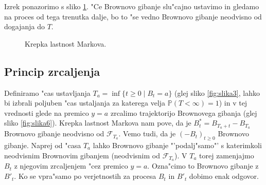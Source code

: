 \documentclass[twoside,11pt]{article}
\begin{document}
\pagebreak
Izrek ponazorimo s sliko \ref{fig:slika5}. "Ce Brownovo gibanje slu"cajno ustavimo in gledamo na proces od tega trenutka dalje, bo to "se vedno Brownovo gibanje neodvisno od dogajanja do $T$. 

\begin{figure}[h]
    \centering
    \caption{Krepka lastnost Markova.}
    \label{fig:slika5}
\end{figure}


\subsection{Princip zrcaljenja}

Definiramo "cas ustavljanja $T_a = \inf\{t \geq 0 \mid B_t = a\}$ (glej sliko \ref{fig:slika3}, lahko bi izbrali poljuben "cas ustaljanja za katerega velja $\mathbb{P}(T < \infty) = 1$) in v tej vrednosti glede na premico $y = a$ zrcalimo trajektorijo Brownovega gibanja (glej sliko \ref{fig:slika6}). 
Krepka lastnost Markova nam pove, da je $B^*_t = B_{T_a + t} - B_{T_a}$ Brownovo gibanje neodvisno od $\mathcal{F}_{T_a}$. Vemo tudi, da je $(-B_t)_{t\geq0}$ Brownovo gibanje. Naprej od "casa $T_a$ lahko Brownovo gibanje "'podalj"samo"' s katerimkoli neodvisnim Brownovim gibanjem (neodvisnim od $\mathcal{F}_{T_a}$). V $T_a$ torej zamenjajmo $B_t$ z njegovim zrcaljenjem "cez premico $y = a$. Ozna"cimo to Brownovo gibanje z $B'_t$. Ko se vpra"samo po verjetnostih za procesa $B_t$ in $B'_t$ dobimo enak odgovor.
\end{document}
